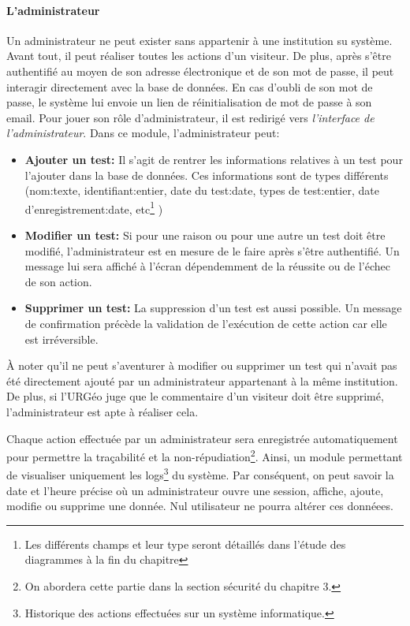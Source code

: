         \paragraph{L'administrateur}
        Un administrateur ne peut exister sans appartenir à une institution su système. Avant tout, il peut réaliser 
        toutes les actions d'un visiteur. De plus, après s'être authentifié au moyen de 
        son adresse électronique et de son mot de passe, il peut interagir directement avec la base de données. En cas 
        d'oubli de son mot de passe, le système lui envoie un lien de réinitialisation de mot de passe à son email.
        Pour jouer son rôle d'administrateur, il est redirigé vers \textit{l'interface de l'administrateur}. 
        Dans ce module, l'administrateur peut:
        \begin{itemize}
                \item \textbf{Ajouter un test: }
                Il s'agit de rentrer les informations relatives à un test pour l'ajouter dans la base de données.
                Ces informations sont de types différents (nom:texte, identifiant:entier, date du test:date, types
                de test:entier, date d'enregistrement:date, etc\footnote{Les différents champs et leur type seront 
                détaillés dans l'étude des diagrammes à la fin du chapitre} )
                \item \textbf{Modifier un test: }
                Si pour une raison ou pour une autre un test doit être modifié, l'administrateur est en
                mesure de le faire après s'être authentifié. Un message lui sera affiché à l'écran dépendemment 
                de la réussite ou de l'échec de son action. 
                \item \textbf{Supprimer un test: }
                La suppression d'un test est aussi possible. Un message de confirmation précède la validation
                de l'exécution de cette action car elle est irréversible.
        \end{itemize}
        \par
        À noter qu'il ne peut s'aventurer à modifier ou supprimer un test qui n'avait pas été directement 
        ajouté par un administrateur appartenant à la même institution. De plus, si l'URGéo juge que le commentaire d'un visiteur doit être supprimé,
        l'administrateur est apte à réaliser cela.
        \par
        Chaque action effectuée par un administrateur sera enregistrée automatiquement pour permettre la traçabilité
        et la non-répudiation\footnote{On abordera cette partie dans la section sécurité du chapitre 3.}.
        Ainsi, un module permettant de visualiser uniquement les logs\footnote{Historique des actions effectuées sur un 
        système informatique.} du système. Par conséquent, on peut savoir
        la date et l'heure précise où un administrateur ouvre une session, affiche, ajoute, modifie ou supprime une donnée.
        Nul utilisateur ne pourra altérer ces donnéees.
        \par

